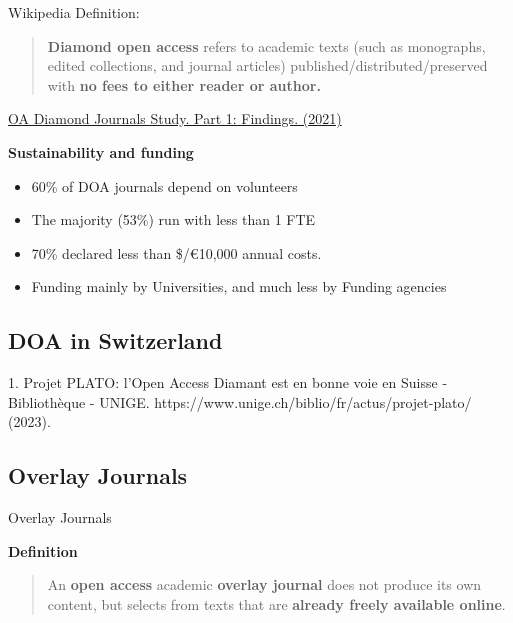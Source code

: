 \documentclass[10pt,compress,serif,aspectratio=169]{beamer}
\begin{document}
\begin{frame}[t]%
 \vskip1cm%

Wikipedia Definition:\newline \newline
 \begin{quote}
   \textbf{Diamond open access} refers to academic texts (such as monographs, edited collections, and journal articles) published/distributed/preserved with \textbf{no fees to either reader or author.} \newline
 \end{quote}

\href{https://doi.org/10.5281/zenodo.4558704}{OA Diamond Journals Study. Part 1: Findings. (2021)\newline}

\textbf{Sustainability and funding}\\
\begin{itemize}
  \item 60\% of DOA journals depend on volunteers
  \item The majority (53\%) run with less than 1 FTE
  \item 70\% declared less than \$/€10,000 annual costs.
  \item Funding mainly by Universities, and much less by Funding agencies
\end{itemize}
\end{frame}


\subsection{DOA in Switzerland}

\begin{frame}[t]%
 \vskip1cm%


 1. Projet PLATO: l’Open Access Diamant est en bonne voie en Suisse - Bibliothèque - UNIGE. https://www.unige.ch/biblio/fr/actus/projet-plato/ (2023).
\end{frame}


\subsection{Overlay Journals}

\begin{frame}[t]{Overlay Journals}

 \textbf{Definition}\newline\newline
 \begin{quote}
   An \textbf{open access} academic \textbf{overlay journal} does not produce its own content, but selects from texts that are \textbf{already freely available online}.
 \end{quote}

 
\end{frame}
 
\end{document}
